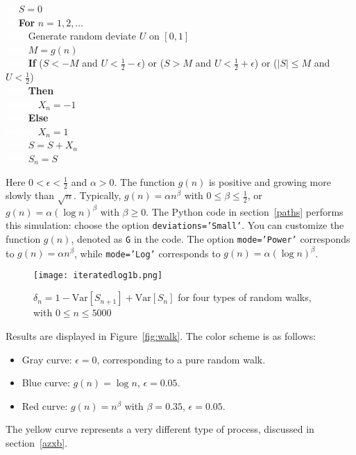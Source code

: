 \documentclass[oneside,10pt]{book}
\begin{document}
\noindent\textcolor{white}{00} $S=0$ \\
\textcolor{white}{00} {\bf For} $n = 1, 2,\dots$\\
\textcolor{white}{0000}  Generate random deviate $U$ on $[0,1]$\\
\textcolor{white}{0000}  $M=g(n)$\\
\textcolor{white}{0000}  {\bf If} ($S< -M$ and $U < \frac{1}{2}-\epsilon$)
or ($S> M$ and $U < \frac{1}{2}+\epsilon$) or ($|S|\leq M$ and $U<\frac{1}{2}$) \\
\textcolor{white}{0000} {\bf Then} \\
\textcolor{white}{000000} $X_n=-1$ \\
\textcolor{white}{0000} {\bf Else} \\
\textcolor{white}{000000} $X_n=1$\\
\textcolor{white}{0000} $S=S+X_n$\\
\textcolor{white}{0000} $S_n=S$ \vspace{1ex}

\noindent Here $0<\epsilon<\frac{1}{2}$ and $\alpha>0$.  The function $g(n)$ is positive and
 growing more slowly than $\sqrt{n}$. Typically, $g(n)=\alpha n^\beta$ with $0\leq \beta\leq\frac{1}{2}$, or $g(n)=\alpha (\log n)^\beta$
 with $\beta\geq 0$.
The Python code in section~\ref{paths} performs this simulation: choose the option \texttt{deviations='Small'}. You can customize the function
 $g(n)$, denoted as \texttt{G} in the code. The option \texttt{mode='Power'} corresponds to $g(n)=\alpha n^\beta$,
 while \texttt{mode='Log'} corresponds to $g(n)=\alpha (\log n)^\beta$.

\begin{figure}%
\centering
\texttt{[image: iteratedlog1b.png]}
\caption{$\delta_n=1-\text{Var}[S_{n+1}]+\text{Var}[S_n]$ for four types of random walks, with $0\leq n\leq\num{5000}$}
\label{fig:lollog1b}
\end{figure}



\noindent Results are displayed in
 Figure~\ref{fig:walk}. The color scheme is as follows:
\begin{itemize}
\item Gray curve: $\epsilon=0$, corresponding to a pure random walk.
\item Blue curve: $g(n)=\log n$, $\epsilon=0.05$.
\item Red curve: $g(n)=n^\beta$ with $\beta=0.35$, $\epsilon=0.05$.
\end{itemize}
The yellow curve represents a very different type of process, discussed in section~\ref{azxb}.
\end{document}
